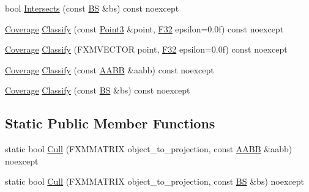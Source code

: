 \begin{DoxyCompactItemize}
\item 
bool \hyperlink{structmage_1_1_view_frustum_a2925f619827d284c86ea5a68e694a8a8}{Intersects} (const \hyperlink{structmage_1_1_b_s}{BS} \&bs) const noexcept
\item 
\hyperlink{namespacemage_aa9fe157e5a578a103160266df8cccb0a}{Coverage} \hyperlink{structmage_1_1_view_frustum_ad93689c175655b62ccbc91304a59cb0b}{Classify} (const \hyperlink{structmage_1_1_point3}{Point3} \&point, \hyperlink{namespacemage_aa97e833b45f06d60a0a9c4fc22ae02c0}{F32} epsilon=0.\+0f) const noexcept
\item 
\hyperlink{namespacemage_aa9fe157e5a578a103160266df8cccb0a}{Coverage} \hyperlink{structmage_1_1_view_frustum_adb125f6696034c543a900f9924a3541f}{Classify} (F\+X\+M\+V\+E\+C\+T\+OR point, \hyperlink{namespacemage_aa97e833b45f06d60a0a9c4fc22ae02c0}{F32} epsilon=0.\+0f) const noexcept
\item 
\hyperlink{namespacemage_aa9fe157e5a578a103160266df8cccb0a}{Coverage} \hyperlink{structmage_1_1_view_frustum_a2c8ac9e080897aa02902d383e64a50e7}{Classify} (const \hyperlink{structmage_1_1_a_a_b_b}{A\+A\+BB} \&aabb) const noexcept
\item 
\hyperlink{namespacemage_aa9fe157e5a578a103160266df8cccb0a}{Coverage} \hyperlink{structmage_1_1_view_frustum_ad614c4948b6a99174d9aeac5dd5825f5}{Classify} (const \hyperlink{structmage_1_1_b_s}{BS} \&bs) const noexcept
\end{DoxyCompactItemize}
\subsection*{Static Public Member Functions}
\begin{DoxyCompactItemize}
\item 
static bool \hyperlink{structmage_1_1_view_frustum_a426fbed6bc71bd195edda01e5c3b2c3f}{Cull} (F\+X\+M\+M\+A\+T\+R\+IX object\+\_\+to\+\_\+projection, const \hyperlink{structmage_1_1_a_a_b_b}{A\+A\+BB} \&aabb) noexcept
\item 
static bool \hyperlink{structmage_1_1_view_frustum_ae07812a46d8c5058267a35b154b603c5}{Cull} (F\+X\+M\+M\+A\+T\+R\+IX object\+\_\+to\+\_\+projection, const \hyperlink{structmage_1_1_b_s}{BS} \&bs) noexcept
\end{DoxyCompactItemize}
